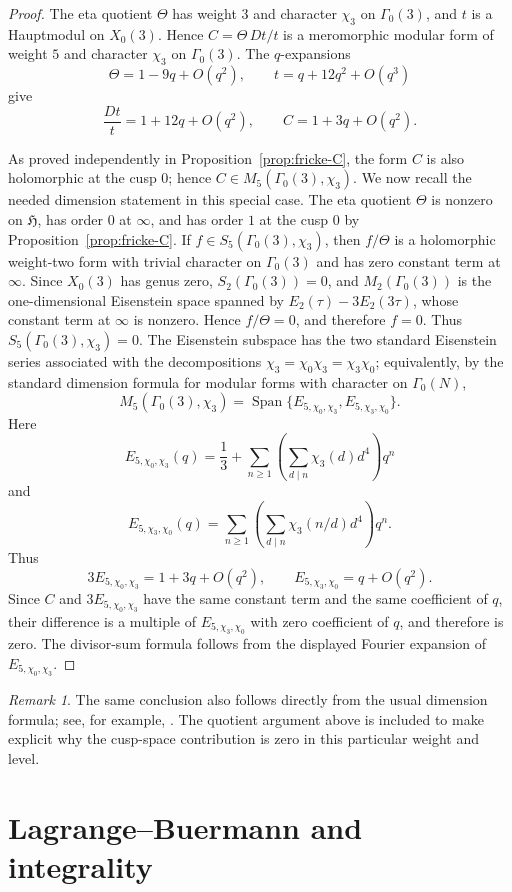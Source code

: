 \documentclass[11pt]{amsart}
\theoremstyle{remark}
\newtheorem{remark}[theorem]{Remark}
\DeclareMathOperator{\Span}{Span}
\newcommand{\HH}{\mathfrak H}
\newcommand{\G}{\Gamma_0(3)}
\begin{document}
\begin{proof}
The eta quotient $\Theta$ has weight $3$ and character $\chi_3$ on $\G$, and $t$ is a Hauptmodul on $X_0(3)$.  Hence $C=\Theta\,Dt/t$ is a meromorphic modular form of weight $5$ and character $\chi_3$ on $\G$.
The $q$-expansions
\[
 \Theta=1-9q+O(q^2),
 \qquad
 t=q+12q^2+O(q^3)
\]
give
\[
 \frac{Dt}{t}=1+12q+O(q^2),
 \qquad
 C=1+3q+O(q^2).
\]

As proved independently in Proposition~\ref{prop:fricke-C}, the form $C$ is also holomorphic at the cusp $0$; hence $C\in M_5(\G,\chi_3)$.
We now recall the needed dimension statement in this special case.  The eta quotient $\Theta$ is nonzero on $\HH$, has order $0$ at $\infty$, and has order $1$ at the cusp $0$ by Proposition~\ref{prop:fricke-C}.  If $f\in S_5(\G,\chi_3)$, then $f/\Theta$ is a holomorphic weight-two form with trivial character on $\G$ and has zero constant term at $\infty$.  Since $X_0(3)$ has genus zero, $S_2(\G)=0$, and $M_2(\G)$ is the one-dimensional Eisenstein space spanned by $E_2(\tau)-3E_2(3\tau)$, whose constant term at $\infty$ is nonzero.  Hence $f/\Theta=0$, and therefore $f=0$.  Thus $S_5(\G,\chi_3)=0$.  The Eisenstein subspace has the two standard Eisenstein series associated with the decompositions $\chi_3=\chi_0\chi_3=\chi_3\chi_0$; equivalently, by the standard dimension formula for modular forms with character on $\Gamma_0(N)$,
\[
 M_5(\G,\chi_3)=\Span\{E_{5,\chi_0,\chi_3},E_{5,\chi_3,\chi_0}\}.
\]
Here
\[
 E_{5,\chi_0,\chi_3}(q)=\frac13+
 \sum_{n\ge1}\left(\sum_{d\mid n}\chi_3(d)d^4\right)q^n
\]
and
\[
 E_{5,\chi_3,\chi_0}(q)=
 \sum_{n\ge1}\left(\sum_{d\mid n}\chi_3(n/d)d^4\right)q^n.
\]
Thus
\[
 3E_{5,\chi_0,\chi_3}=1+3q+O(q^2),
 \qquad
 E_{5,\chi_3,\chi_0}=q+O(q^2).
\]
Since $C$ and $3E_{5,\chi_0,\chi_3}$ have the same constant term and the same coefficient of $q$, their difference is a multiple of $E_{5,\chi_3,\chi_0}$ with zero coefficient of $q$, and therefore is zero.  The divisor-sum formula follows from the displayed Fourier expansion of $E_{5,\chi_0,\chi_3}$.
\end{proof}

\begin{remark}
The same conclusion also follows directly from the usual dimension formula; see, for example, \cite[Sections 3.5--3.6]{DS}.  The quotient argument above is included to make explicit why the cusp-space contribution is zero in this particular weight and level.
\end{remark}

\section{Lagrange--Buermann and integrality}\label{sec:LB}
\end{document}
